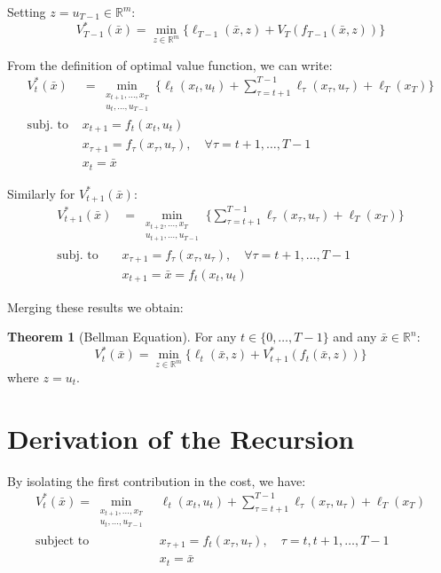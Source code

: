 \documentclass[openany]{book}
\newcommand{\R}{\mathbb{R}}               %
\theoremstyle{definition}
\newtheorem{theorem}{Theorem}[section]
\theoremstyle{remark}
\begin{document}
Setting $z = u_{T-1}\in\R^m$:
\[
    V_{T-1}^*(\bar{x}) = \min_{z\in\R^m} \{\ell_{T-1}(\bar{x},z) + V_T(f_{T-1}(\bar{x},z))\}
\]

From the definition of optimal value function, we can write:
\begin{align*}
    V_t^*(\bar{x}) &= \min_{\substack{x_{t+1},\dots,x_T \\ u_t,\dots,u_{T-1}}} \{\ell_t(x_t,u_t) + \sum_{\tau=t+1}^{T-1} \ell_\tau(x_\tau,u_\tau) + \ell_T(x_T)\} \\
    \text{subj. to } & x_{t+1} = f_t(x_t,u_t) \\
    & x_{\tau+1} = f_\tau(x_\tau,u_\tau), \quad \forall\tau=t+1,\dots,T-1 \\
    & x_t = \bar{x}
\end{align*}

Similarly for $V_{t+1}^*(\bar{x})$:
\begin{align*}
    V_{t+1}^*(\bar{x}) &= \min_{\substack{x_{t+2},\dots,x_T \\ u_{t+1},\dots,u_{T-1}}} \{\sum_{\tau=t+1}^{T-1} \ell_\tau(x_\tau,u_\tau) + \ell_T(x_T)\} \\
    \text{subj. to } & x_{\tau+1} = f_\tau(x_\tau,u_\tau), \quad \forall\tau=t+1,\dots,T-1 \\
    & x_{t+1} = \bar{x} = f_t(x_t,u_t)
\end{align*}

Merging these results we obtain:

\begin{theorem}[Bellman Equation]
For any $t \in \{0,\dots,T-1\}$ and any $\bar{x} \in \R^n$:
\[
    V_t^*(\bar{x}) = \min_{z\in\R^m} \{\ell_t(\bar{x},z) + V_{t+1}^*(f_t(\bar{x},z))\}
\]
where $z = u_t$.
\end{theorem}


\section{Derivation of the Recursion}
By isolating the first contribution in the cost, we have:
\begin{align*}
    V_t^*(\bar{x}) = \min_{\substack{x_{t+1},\dots,x_T \\ u_t,\dots,u_{T-1}}} & \ell_t(x_t,u_t) + \sum_{\tau=t+1}^{T-1} \ell_\tau(x_\tau,u_\tau) + \ell_T(x_T)\\
    \text{subject to } & x_{\tau+1} = f_t(x_\tau,u_\tau), \quad \tau=t,t+1,\dots,T-1\\
    & x_t = \bar{x}
\end{align*}
\end{document}
